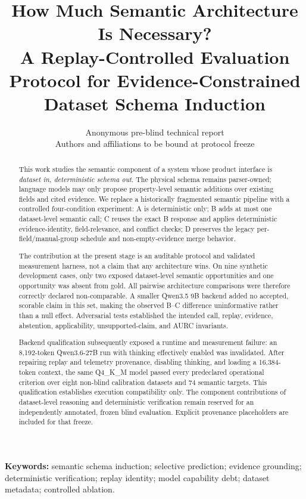 \documentclass[11pt]{article}
\title{\textbf{How Much Semantic Architecture Is Necessary?}\\
\large A Replay-Controlled Evaluation Protocol for Evidence-Constrained Dataset Schema Induction}
\author{Anonymous pre-blind technical report\\
\small Authors and affiliations to be bound at protocol freeze}
\date{\PaperDate}
\begin{document}
\maketitle

\begin{abstract}
This work studies the semantic component of a system whose product interface is
\emph{dataset in, deterministic schema out}. The physical schema remains parser-owned;
language models may only propose property-level semantic additions over existing
fields and cited evidence. We replace a historically fragmented semantic pipeline
with a controlled four-condition experiment: A is deterministic only; B adds at
most one dataset-level semantic call; C reuses the exact B response and applies
deterministic evidence-identity, field-relevance, and conflict checks; D preserves
the legacy per-field/manual-group schedule and non-empty-evidence merge behavior.

The contribution at the present stage is an auditable protocol and validated
measurement harness, not a claim that any architecture wins. On nine synthetic
development cases, only two exposed dataset-level semantic opportunities and one
opportunity was absent from gold. All pairwise architecture comparisons were
therefore correctly declared non-comparable. A smaller Qwen3.5 9B backend added no
accepted, scorable claim in this set, making the observed B--C difference
uninformative rather than a null effect. Adversarial tests established the intended
call, replay, evidence, abstention, applicability, unsupported-claim, and AURC
invariants.

Backend qualification subsequently exposed a runtime and measurement failure: an
8,192-token Qwen3.6-27B run with thinking effectively enabled was invalidated. After
repairing replay and telemetry provenance, disabling thinking, and loading a
16,384-token context, the same Q4\_K\_M model passed every predeclared operational
criterion over eight non-blind calibration datasets and 74 semantic targets. This
qualification establishes execution compatibility only. The component
contributions of dataset-level reasoning and deterministic verification remain
reserved for an
independently annotated, frozen blind evaluation. Explicit provenance placeholders
are included for that freeze.
\end{abstract}

\noindent\textbf{Keywords:} semantic schema induction; selective prediction;
evidence grounding; deterministic verification; replay identity; model capability
debt; dataset metadata; controlled ablation.
\end{document}
